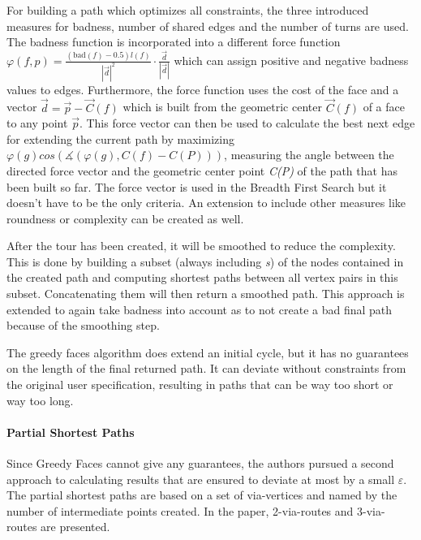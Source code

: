 For building a path which optimizes all constraints, the three introduced measures for badness, number of shared edges and the number of turns are used.
The badness function is incorporated into a different force function $\varphi (f,p) = \frac{(\text{bad}(f)-0.5)l(f)}{|\vec{d}|^2} \cdot \frac{\vec{d}}{|\vec{d}|}$ which can assign positive and negative badness values to edges.
Furthermore, the force function uses the cost of the face and a vector $\vec{d} = \vec{p} - \vec{C}(f)$ which is built from the geometric center $\vec{C}(f)$ of a face to any point $\vec{p}$. 
This force vector can then be used to calculate the best next edge for extending the current path by maximizing $\varphi(g) cos (\measuredangle (\varphi(g), C(f) - C(P)))$, measuring the angle between the directed force vector and the geometric center point \textit{C(P)} of the path that has been built so far.
The force vector is used in the Breadth First Search but it doesn't have to be the only criteria.
An extension to include other measures like roundness or complexity can be created as well. \cite{gemsa_efficient_2013}


After the tour has been created, it will be smoothed to reduce the complexity.
This is done by building a subset (always including \textit{s}) of the nodes contained in the created path and computing shortest paths between all vertex pairs in this subset. 
Concatenating them will then return a smoothed path.
This approach is extended to again take badness into account as to not create a bad final path because of the smoothing step. \cite{gemsa_efficient_2013}

The greedy faces algorithm does extend an initial cycle, but it has no guarantees on the length of the final returned path.
It can deviate without constraints from the original user specification, resulting in paths that can be way too short or way too long. \cite{gemsa_efficient_2013}


\paragraph{Partial Shortest Paths}

Since Greedy Faces cannot give any guarantees, the authors pursued a second approach to calculating results that are ensured to deviate at most by a small $\varepsilon$.
The partial shortest paths are based on a set of via-vertices and named by the number of intermediate points created. 
In the paper, 2-via-routes and 3-via-routes are presented.

